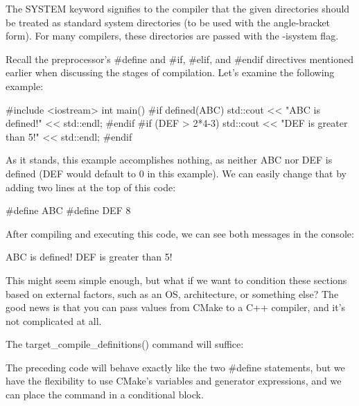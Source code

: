 The SYSTEM keyword signifies to the compiler that the given directories should be treated as standard system directories (to be used with the angle-bracket form). For many compilers, these directories are passed with the -isystem flag.


Recall the preprocessor’s \#define and \#if, \#elif, and \#endif directives mentioned earlier when discussing the stages of compilation. Let’s examine the following example:


\begin{cpp}
#include <iostream>
int main() {
#if defined(ABC)
    std::cout << "ABC is defined!" << std::endl;
#endif
#if (DEF > 2*4-3)
    std::cout << "DEF is greater than 5!" << std::endl;
#endif
}
\end{cpp}

As it stands, this example accomplishes nothing, as neither ABC nor DEF is defined (DEF would default to 0 in this example). We can easily change that by adding two lines at the top of this code:

\begin{cpp}
#define ABC
#define DEF 8
\end{cpp}

After compiling and executing this code, we can see both messages in the console:

\begin{shell}
ABC is defined!
DEF is greater than 5!
\end{shell}

This might seem simple enough, but what if we want to condition these sections based on external factors, such as an OS, architecture, or something else? The good news is that you can pass values from CMake to a C++ compiler, and it’s not complicated at all.

The target\_compile\_definitions() command will suffice:



The preceding code will behave exactly like the two \#define statements, but we have the flexibility to use CMake’s variables and generator expressions, and we can place the command in a conditional block.

